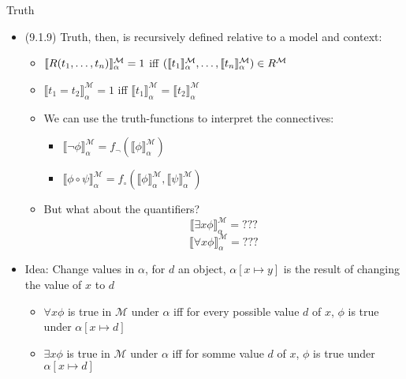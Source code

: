 \begin{frame}{Truth}

	\begin{itemize}
		
		\item (9.1.9) Truth, then, is recursively defined relative to a model and context:
		
		\begin{itemize}
		
			 \item { $\llbracket R(t_1, \mathellipsis, t_n)\rrbracket^\mathcal{M}_\alpha=1$ iff $(\llbracket t_1\rrbracket^\mathcal{M}_\alpha, \mathellipsis, \llbracket t_n\rrbracket^\mathcal{M}_\alpha)\in R^\mathcal{M}$}
				
			\item {$\llbracket t_1=t_2\rrbracket^\mathcal{M}_\alpha=1$  iff $\llbracket t_1\rrbracket^\mathcal{M}_\alpha=\llbracket t_2\rrbracket^\mathcal{M}_\alpha$}
			
			\item We can use the truth-functions to interpret the connectives: 
			\begin{itemize}
			
			\item $\llbracket \neg\phi\rrbracket^\mathcal{M}_\alpha=f_\neg(\llbracket\phi\rrbracket^\mathcal{M}_\alpha)$	
			
			\item $\llbracket\phi\circ\psi\rrbracket^\mathcal{M}_\alpha=f_\circ(\llbracket\phi\rrbracket^\mathcal{M}_\alpha,\llbracket\psi\rrbracket^\mathcal{M}_\alpha)$
			
			\end{itemize}
					
			\item But what about the quantifiers?
			\[\llbracket \exists x\phi\rrbracket^\mathcal{M}_\alpha=???\]\[\llbracket \forall x\phi\rrbracket^\mathcal{M}_\alpha=???\]
		
		\end{itemize}
		
		\item Idea: Change values in $\alpha$, for $d$ an object, $\alpha[x\mapsto y]$ is the result of changing the value of $x$ to $d$
		
		\begin{itemize}
		
			\item $\forall x\phi$ is true in $\mathcal{M}$ under $\alpha$ iff for every possible value $d$ of $x$, $\phi$ is true under $\alpha[x\mapsto d]$ 
			\item $\exists x\phi$ is true in $\mathcal{M}$ under $\alpha$ iff for somme value $d$ of $x$, $\phi$ is true under $\alpha[x\mapsto d]$ 
		
		\end{itemize}
		
	\end{itemize}

\end{frame}

